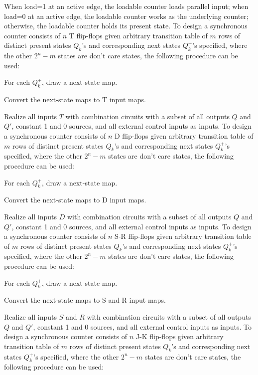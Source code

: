 \documentclass[a4paper,12pt]{report}
\begin{document}
When load=1 at an active edge, the loadable counter loads parallel input; when load=0 at an active edge, the loadable counter works as the underlying counter; otherwise, the loadable counter holds its present state.
To design a synchronous counter consists of $n$ T flip-flops given arbitrary transition table of $m$ rows of distinct present states $Q_k$'s and corresponding next states $Q^+_k$'s specified, where the other $2^n-m$ states are don't care states, the following procedure can be used:
\ben
\item For each $Q^+_k$, draw a next-state map.
\item Convert the next-state maps to T input maps.
\item Realize all inputs $T$ with combination circuits with a subset of all outputs $Q$ and $Q'$, constant 1 and 0 sources, and all external control inputs as inputs.
\een
{}
To design a synchronous counter consists of $n$ D flip-flops given arbitrary transition table of $m$ rows of distinct present states $Q_k$'s and corresponding next states $Q^+_k$'s specified, where the other $2^n-m$ states are don't care states, the following procedure can be used:
\ben
\item For each $Q^+_k$, draw a next-state map.
\item Convert the next-state maps to D input maps.
\item Realize all inputs $D$ with combination circuits with a subset of all outputs $Q$ and $Q'$, constant 1 and 0 sources, and all external control inputs as inputs.
\een
{}
To design a synchronous counter consists of $n$ S-R flip-flops given arbitrary transition table of $m$ rows of distinct present states $Q_k$'s and corresponding next states $Q^+_k$'s specified, where the other $2^n-m$ states are don't care states, the following procedure can be used:
\ben
\item For each $Q^+_k$, draw a next-state map.
\item Convert the next-state maps to S and R input maps.
\item Realize all inputs $S$ and $R$ with combination circuits with a subset of all outputs $Q$ and $Q'$, constant 1 and 0 sources, and all external control inputs as inputs.
\een
{}
To design a synchronous counter consists of $n$ J-K flip-flops given arbitrary transition table of $m$ rows of distinct present states $Q_k$'s and corresponding next states $Q^+_k$'s specified, where the other $2^n-m$ states are don't care states, the following procedure can be used:
\end{document}
